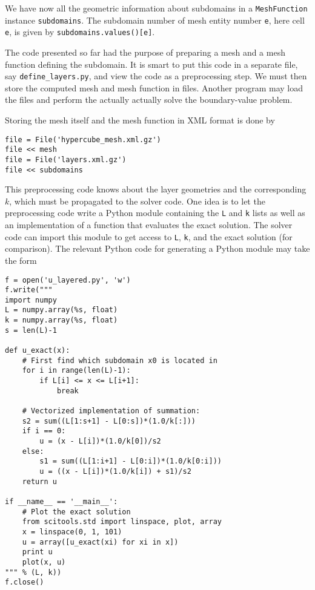 We have now all the geometric information about subdomains in
a {\fontsize{12pt}{12pt}\texttt{MeshFunction}} instance {\fontsize{12pt}{12pt}\texttt{subdomains}}. The subdomain number
of mesh entity number {\fontsize{12pt}{12pt}\texttt{e}}, here cell {\fontsize{12pt}{12pt}\texttt{e}}, is given
by {\fontsize{12pt}{12pt}\texttt{subdomains.values()[e]}}.

The code presented so far had the purpose of preparing a mesh and
a mesh function defining the subdomain. It is smart to put this code
in a separate file, say {\fontsize{12pt}{12pt}\verb!define_layers.py!},
and view the code as a preprocessing step.
We must then store the computed mesh and mesh function in files.
Another program may load the files and perform the actually 
actually solve the boundary-value problem.

Storing the mesh itself and the mesh function in XML format is done by
\begin{Verbatim}[fontsize=\fontsize{10pt}{10pt},tabsize=8,baselinestretch=1.05,
fontfamily=tt,xleftmargin=7mm]
file = File('hypercube_mesh.xml.gz')
file << mesh
file = File('layers.xml.gz')
file << subdomains
\end{Verbatim}
\noindent

This preprocessing code knows about the layer geometries and
the corresponding $k$, which
must be propagated to the solver code. One idea is to let the
preprocessing code write a Python module containing
the {\fontsize{12pt}{12pt}\texttt{L}} and {\fontsize{12pt}{12pt}\texttt{k}} lists as well as an implementation of a
function that evaluates the exact solution.
The solver code can import this module to get access to {\fontsize{12pt}{12pt}\texttt{L}},
{\fontsize{12pt}{12pt}\texttt{k}}, and the exact solution (for comparison).
The relevant Python code for generating a Python module may take
the form
\begin{Verbatim}[fontsize=\fontsize{10pt}{10pt},tabsize=8,baselinestretch=1.05,
fontfamily=tt,xleftmargin=7mm]
f = open('u_layered.py', 'w')
f.write("""
import numpy
L = numpy.array(%s, float)
k = numpy.array(%s, float)
s = len(L)-1

def u_exact(x):
    # First find which subdomain x0 is located in
    for i in range(len(L)-1):
        if L[i] <= x <= L[i+1]:
            break

    # Vectorized implementation of summation:
    s2 = sum((L[1:s+1] - L[0:s])*(1.0/k[:]))
    if i == 0:
        u = (x - L[i])*(1.0/k[0])/s2
    else:
        s1 = sum((L[1:i+1] - L[0:i])*(1.0/k[0:i]))
        u = ((x - L[i])*(1.0/k[i]) + s1)/s2
    return u

if __name__ == '__main__':
    # Plot the exact solution
    from scitools.std import linspace, plot, array
    x = linspace(0, 1, 101)
    u = array([u_exact(xi) for xi in x])
    print u
    plot(x, u)
""" % (L, k))
f.close()
\end{Verbatim}
\noindent


